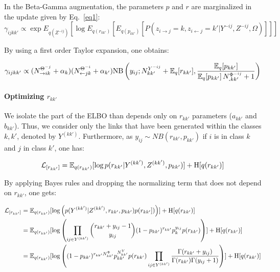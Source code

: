 In the Beta-Gamma augmentation, the parameters $p$ and $r$ are marginalized in the update given by Eq.~\eqref{eq1}:
\begin{equation}
\gamma_{ijkk'} \propto \exp E_{q(Z^{-ij})} [\log E_{q(r_{kk'})}[E_{q(p_{kk'})}[ P(z_{i\rightarrow j}=k, z_{i\leftarrow j}=k' | Y^{-ij}, Z^{-ij}, \Omega) ] ] ] \nonumber
\end{equation}

By using a first order Taylor expansion, one obtains:

\begin{equation}
\gamma_{ijkk'} \propto (N_{\rightarrow ik}^{\Theta^{-j}} + \alpha_k) (N_{\leftarrow jk}^{\Theta^{-i}} + \alpha_{k'}) \mathrm{NB}\left(y_{ij}; N^{Y^{-ij}}_{kk'} + \mathbb{E}_{q}[r_{kk'}], \frac{\mathbb{E}_{q}[p_{kk'}]}{\mathbb{E}_{q}[p_{kk'}]\,N^{\Phi^{-ij}}_{\bm{.}kk'} + 1} \right) \nonumber
\end{equation}

\paragraph{Optimizing $r_{kk'}$}

We isolate the part of the ELBO than depends only on $r_{kk'}$ parameters ($a_{kk'}$ and $b_{kk'}$). Thus, we consider only the links that have been generated within the classes $k,k'$, denoted by $Y^{(kk')}$. Furthermore, as $y_{ij} \sim NB(r_{kk'}, p_{kk'})$ if $i$ is in class $k$ and $j$ in class $k'$, one has:

\begin{align*}
\mathcal{L}_{[r_{kk'}]} = \mathbb{E}_{q(r_{kk'})}[\log p(r_{kk'}|Y^{(kk')},Z^{(kk')},p_{kk'})] + \textrm{H}[q(r_{kk'})] \\
\end{align*}

By applying Bayes rules and dropping the normalizing term that does not depend on $r_{kk'}$, one gets:

\begin{align*}
\mathcal{L}_{[r_{kk'}]} &= \mathbb{E}_{q(r_{kk'})}[\log \left( p(Y^{(kk')}|Z^{(kk')}, r_{kk'}, p_{kk'}) p(r_{kk'}]) \right)] + \textrm{H}[q(r_{kk'})] \\
    &= \mathbb{E}_{q(r_{kk'})}[\log \left( \prod_{ij\in Y^{(kk')}} \dbinom{r_{kk'} + y_{ij}-1}{y_{ij}} (1-p_{kk'})^{r_{kk'}} p_k^{y_{ij}} p(r_{kk'}) \right) ] + \textrm{H}[q(r_{kk'})] \\
    &= \mathbb{E}_{q(r_{kk'})}[\log \left( (1-p_{kk'})^{r_{kk'} N^{\Phi}_{kk'}} p_{kk'}^{N^{Y}_{kk'}} p(r_{kk'}) \prod_{ij\in Y^{(kk')}} \frac{\Gamma(r_{kk'}+y_{ij})}{\Gamma(r_{kk'}) \Gamma(y_{ij}+1) }  \right) ] + \textrm{H}[q(r_{kk'})]
\end{align*}

